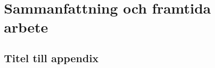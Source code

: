 \documentclass[twoside, openright]{report}
\begin{document}
\newpage
\chapter{Sammanfattning och framtida arbete}\label{chap:SamFut}
  

\newpage
{}
\printbibliography[title=Litteraturförteckning]

\newpage
\begin{appendices}
  \chapter{Titel till appendix}
  
\end{appendices}
\end{document}
